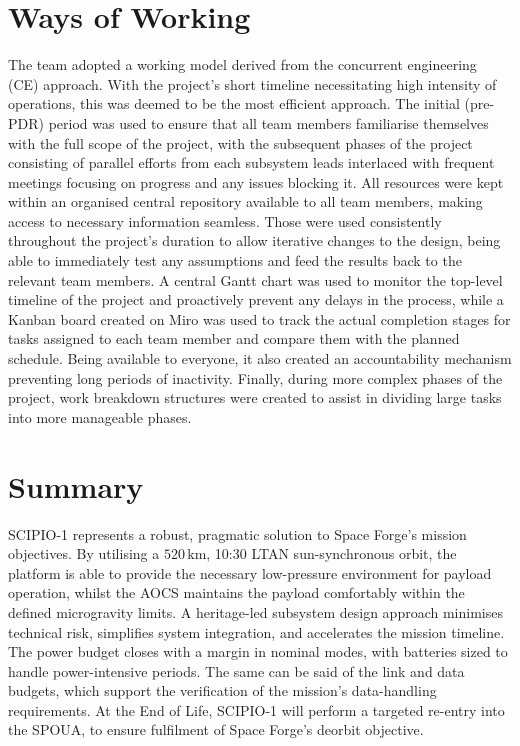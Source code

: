 \documentclass[a4paper, 11pt, conference]{IEEEtran}
\begin{document}
\section{Ways of Working}
The team adopted a working model derived from the concurrent engineering (CE) approach. With the project’s short timeline necessitating high intensity of operations, this was deemed to be the most efficient approach. The initial (pre-PDR) period was used to ensure that all team members familiarise themselves with the full scope of the project, with the subsequent phases of the project consisting of parallel efforts from each subsystem leads interlaced with frequent meetings focusing on progress and any issues blocking it. All resources were kept within an organised central repository available to all team members, making access to necessary information seamless. Those were used consistently throughout the project’s duration to allow iterative changes to the design, being able to immediately test any assumptions and feed the results back to the relevant team members. A central Gantt chart was used to monitor the top-level timeline of the project and proactively prevent any delays in the process, while a Kanban board created on Miro was used to track the actual completion stages for tasks assigned to each team member and compare them with the planned schedule. Being available to everyone, it also created an accountability mechanism preventing long periods of inactivity. Finally, during more complex phases of the project, work breakdown structures were created to assist in dividing large tasks into more manageable phases. 

\section{Summary}

SCIPIO-1 represents a robust, pragmatic solution to Space Forge’s mission objectives. By utilising a $520\,\mathrm{km}$, 10:30 LTAN sun-synchronous orbit, the platform is able to provide the necessary low-pressure environment for payload operation, whilst the AOCS maintains the payload comfortably within the defined microgravity limits. A heritage-led subsystem design approach minimises technical risk, simplifies system integration, and accelerates the mission timeline. The power budget closes with a margin in nominal modes, with batteries sized to handle power-intensive periods. The same can be said of the link and data budgets, which support the verification of the mission's data-handling requirements. At the End of Life, SCIPIO-1 will perform a targeted re-entry into the SPOUA, to ensure fulfilment of Space Forge's deorbit objective. 
\end{document}
